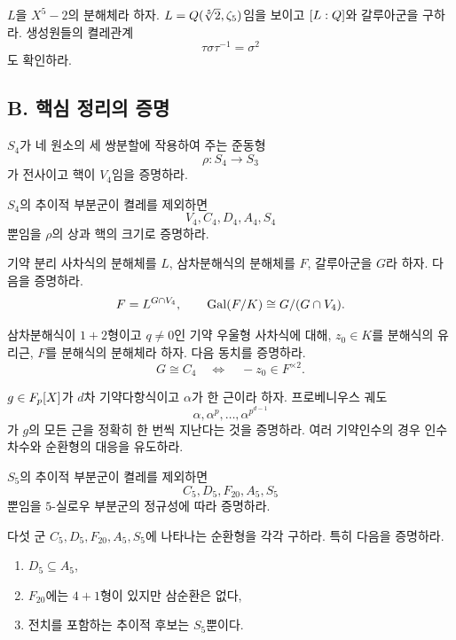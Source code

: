 \begin{exercise}
$L$을 $X^5-2$의 분해체라 하자. $L=Q(\sqrt[5]2,\zeta_5)$임을 보이고 $[L:Q]$와 갈루아군을 구하라. 생성원들의 켤레관계
\[
  \tau\sigma\tau^{-1}=\sigma^2
\]
도 확인하라.
\end{exercise}

\subsection*{B. 핵심 정리의 증명}

\begin{exercise}[*]
$S_4$가 네 원소의 세 쌍분할에 작용하여 주는 준동형
\[
  \rho:S_4\to S_3
\]
가 전사이고 핵이 $V_4$임을 증명하라.
\end{exercise}

\begin{exercise}[*]
$S_4$의 추이적 부분군이 켤레를 제외하면
\[
  V_4,C_4,D_4,A_4,S_4
\]
뿐임을 $\rho$의 상과 핵의 크기로 증명하라.
\end{exercise}

\begin{exercise}[*]
기약 분리 사차식의 분해체를 $L$, 삼차분해식의 분해체를 $F$, 갈루아군을 $G$라 하자. 다음을 증명하라.
\[
  F=L^{G\cap V_4},
  \qquad
  \operatorname{Gal}(F/K)\cong G/(G\cap V_4).
\]
\end{exercise}

\begin{exercise}
삼차분해식이 $1+2$형이고 $q\ne0$인 기약 우울형 사차식에 대해, $z_0\in K$를 분해식의 유리근, $F$를 분해식의 분해체라 하자. 다음 동치를 증명하라.
\[
  G\cong C_4
  \quad\Longleftrightarrow\quad
  -z_0\in F^{\times2}.
\]
\end{exercise}

\begin{exercise}[*]
$g\in F_p[X]$가 $d$차 기약다항식이고 $\alpha$가 한 근이라 하자. 프로베니우스 궤도
\[
  \alpha,\alpha^p,\dots,\alpha^{p^{d-1}}
\]
가 $g$의 모든 근을 정확히 한 번씩 지난다는 것을 증명하라. 여러 기약인수의 경우 인수차수와 순환형의 대응을 유도하라.
\end{exercise}

\begin{exercise}[*]
$S_5$의 추이적 부분군이 켤레를 제외하면
\[
  C_5,D_5,F_{20},A_5,S_5
\]
뿐임을 $5$-실로우 부분군의 정규성에 따라 증명하라.
\end{exercise}

\begin{exercise}
다섯 군 $C_5,D_5,F_{20},A_5,S_5$에 나타나는 순환형을 각각 구하라. 특히 다음을 증명하라.
\begin{enumerate}[label=(\alph*)]
  \item $D_5\subseteq A_5$,
  \item $F_{20}$에는 $4+1$형이 있지만 삼순환은 없다,
  \item 전치를 포함하는 추이적 후보는 $S_5$뿐이다.
\end{enumerate}
\end{exercise}

